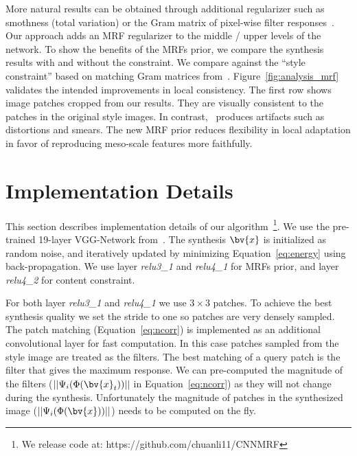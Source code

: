 \documentclass[10pt,twocolumn,letterpaper]{article}
\begin{document}
More natural results can be obtained through additional regularizer such as smothness (total variation) or the Gram matrix of pixel-wise filter responses~\cite{Mahendran15,Gatys15}.
Our approach adds an MRF regularizer to the middle / upper levels of the network.
%
To show the benefits of the MRFs prior, we compare the synthesis results with and without the constraint. We compare against the ``style constraint'' based on matching Gram matrices from~\cite{Gatys15}. Figure~\ref{fig:analysis_mrf} validates the intended improvements in local consistency. The first row shows image patches cropped from our results. They are visually consistent to the patches in the original style images. In contrast,~\cite{Gatys15} produces artifacts such as distortions and smears. The new MRF prior reduces flexibility in local adaptation in favor of reproducing meso-scale features more faithfully.

\section{Implementation Details}
This section describes implementation details of our algorithm~\footnote{We release code at: https://github.com/chuanli11/CNNMRF}. We use the pre-trained 19-layer VGG-Network from~\cite{Simonyan14c}. The synthesis $\bv{x}$ is initialized as random noise, and iteratively updated by minimizing Equation~\ref{eq:energy} using back-propagation. We use layer \textit{relu3\_1} and \textit{relu4\_1} for MRFs prior, and layer \textit{relu4\_2} for content constraint. 

For both layer \textit{relu3\_1} and \textit{relu4\_1} we use $3 \times 3$ patches. To achieve the best synthesis quality we set the stride to one so patches are very densely sampled. The patch matching (Equation~\ref{eq:ncorr}) is implemented as an additional convolutional layer for fast computation. In this case patches sampled from the style image are treated as the filters. The best matching of a query patch is the filter that gives the maximum response. We can pre-computed the magnitude of the filters ($||\Psi_i(\Phi(\bv{x}_{t}))||$ in Equation~\ref{eq:ncorr}) as they will not change during the synthesis. Unfortunately the magnitude of patches in the synthesized image ($||\Psi_i(\Phi(\bv{x}))||$) needs to be computed on the fly.
\end{document}
